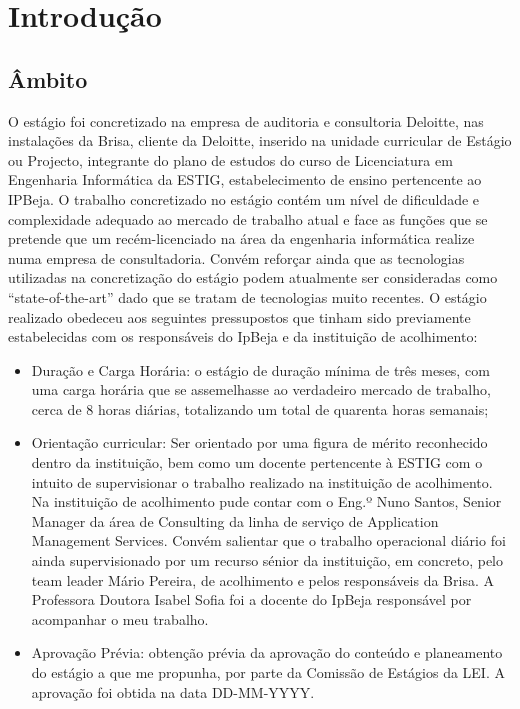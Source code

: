 \chapter{Introdução}
\label{intro}

\section{Âmbito}

\par O estágio foi concretizado na empresa de auditoria e consultoria Deloitte, nas instalações da Brisa, cliente da Deloitte, inserido na unidade curricular de Estágio ou Projecto, integrante do plano de estudos do curso de Licenciatura em Engenharia Informática da ESTIG, estabelecimento de ensino pertencente ao IPBeja. O trabalho concretizado no estágio contém um nível de dificuldade e complexidade adequado ao mercado de trabalho atual e face as funções que se pretende que um recém-licenciado na área da engenharia informática realize numa empresa de consultadoria. Convém reforçar ainda que as tecnologias utilizadas na concretização do estágio podem atualmente ser consideradas como “state-of-the-art” dado que se tratam de tecnologias muito recentes. O estágio realizado obedeceu aos seguintes pressupostos que tinham sido previamente estabelecidas com os responsáveis do IpBeja e da instituição de acolhimento:
\vspace{-0mm}
\begin{itemize}  \itemsep1pt \parskip0pt 
 \item Duração e Carga Horária: o estágio de duração mínima de três meses, com uma carga horária que se assemelhasse ao verdadeiro mercado de trabalho, cerca de 8 horas diárias, totalizando um total de quarenta horas semanais;
 \item Orientação curricular: Ser orientado por uma figura de mérito reconhecido dentro da instituição, bem como um docente pertencente à ESTIG com o intuito de supervisionar o trabalho realizado na instituição de acolhimento. Na instituição de acolhimento pude contar com o Eng.º Nuno Santos, Senior Manager da área de Consulting da linha de serviço de Application Management Services. Convém salientar que o trabalho operacional diário foi ainda supervisionado por um recurso sénior da instituição, em concreto, pelo team leader Mário Pereira, de acolhimento e pelos responsáveis da Brisa.  A Professora Doutora Isabel Sofia foi a docente do IpBeja responsável por acompanhar o meu trabalho.
\item Aprovação Prévia: obtenção prévia da aprovação do conteúdo e planeamento do estágio a que me propunha, por parte da Comissão de Estágios da LEI. A aprovação foi obtida na data DD-MM-YYYY.
\end{itemize}

